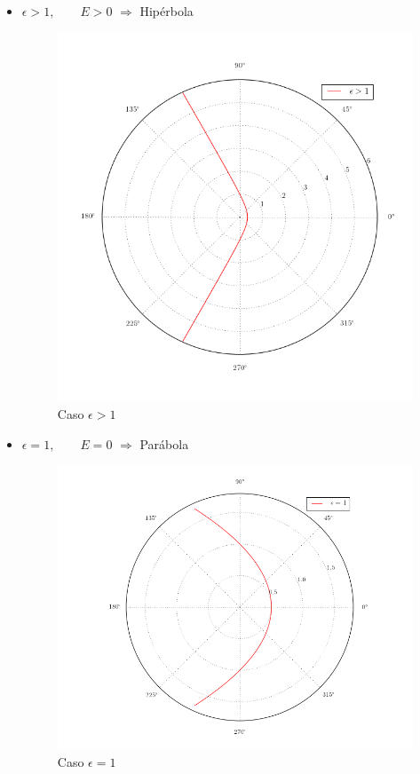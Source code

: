 \documentclass[a4paper,10pt]{article}
\numberwithin{equation}{section}
\begin{document}
\begin{itemize}
 \item $\epsilon > 1, \qquad E>0$ $\Rightarrow$ Hipérbola

\begin{figure}[H]
 \center 
 \includegraphics[scale=0.5]{problema5fig1}
 \caption{Caso $\epsilon > 1$}
 \label{fig:hiperbola}
\end{figure}

\newpage %

 \item $\epsilon = 1, \qquad E=0$ $\Rightarrow$ Parábola


\begin{figure}[H]
 \center 
 \includegraphics[scale=0.45]{problema5fig2}
 \caption{Caso $\epsilon = 1$}
 \label{fig:parabola}
\end{figure}


\end{itemize}
\end{document}
